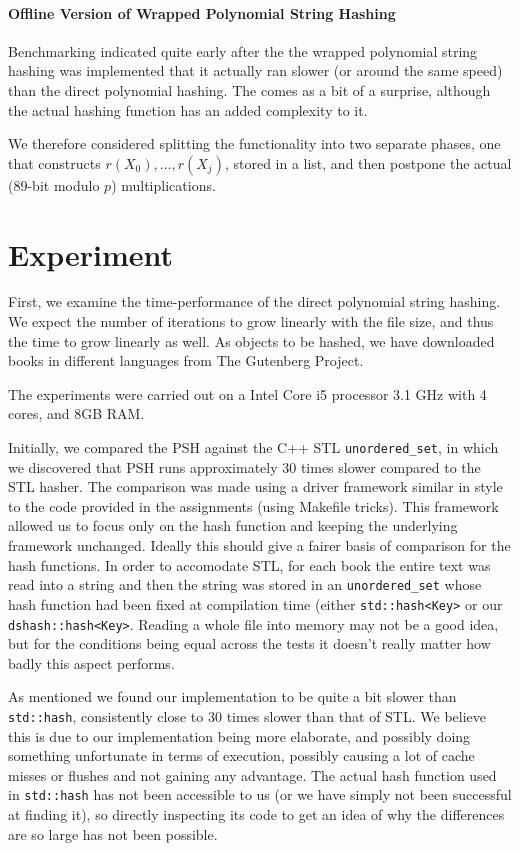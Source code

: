 \documentclass[]{article}
\newcommand{\funk}[1]{\small\texttt{#1}}
\newcommand{\cpp}{C+\!+\xspace}
\begin{document}
\paragraph{Offline Version of Wrapped Polynomial String Hashing}

Benchmarking indicated quite early after the the wrapped polynomial string hashing was implemented that it actually ran slower (or around the same speed) than the direct polynomial hashing. The comes as a bit of a surprise, although the actual hashing function has an added complexity to it.

We therefore considered splitting the functionality into two separate phases, one that constructs $r(X_0),\dots,r(X_j)$, stored in a list, and then postpone the actual (89-bit modulo $p$) multiplications.


\section{Experiment}
First, we examine the time-performance of the direct polynomial string hashing. We expect the number of iterations to grow linearly with the file size, and thus the time to grow linearly as well.
As objects to be hashed, we have downloaded books in different languages from The Gutenberg Project.

The experiments were carried out on a Intel Core i5 processor 3.1 GHz with 4 cores, and 8GB RAM.

Initially, we compared the PSH against the \cpp STL \funk{unordered\_set}, in which we discovered that PSH runs approximately 30 times slower compared to the STL hasher. The comparison was made using a driver framework similar in style to the code provided in the assignments (using Makefile tricks). This framework allowed us to focus only on the hash function and keeping the underlying framework unchanged. Ideally this should give a fairer basis of comparison for the hash functions. In order to accomodate STL, for each book the entire text was read into a string and then the string was stored in an \funk{unordered\_set} whose hash function had been fixed at compilation time (either \funk{std::hash<Key>} or our \funk{dshash::hash<Key>}. Reading a whole file into memory may not be a good idea, but for the conditions being equal across the tests it doesn't really matter how badly this aspect performs.

As mentioned we found our implementation to be quite a bit slower than \funk{std::hash}, consistently close to 30 times slower than that of STL. We believe this is due to our implementation being more elaborate, and possibly doing something unfortunate in terms of execution, possibly causing a lot of cache misses or flushes and not gaining any advantage. The actual hash function used in \funk{std::hash} has not been accessible to us (or we have simply not been successful at finding it), so directly inspecting its code to get an idea of why the differences are so large has not been possible.
\end{document}
